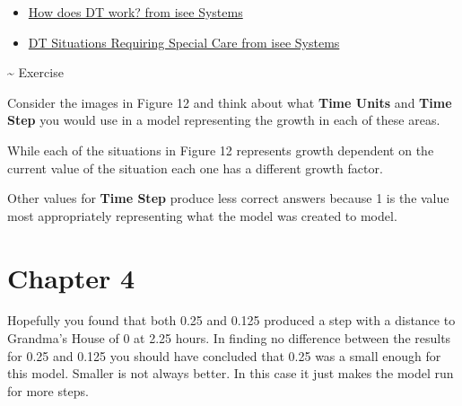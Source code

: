 \documentclass[]{memoir}
\renewcommand{\u}[1]{\textbf{#1}}
\begin{document}
\begin{itemize}
\itemsep1pt\parskip0pt
\item
  \href{http://www.iseesystems.com/Helpv9/Content/DT/How_does_DT_work_.htm}{How
  does DT work? from isee Systems}
\item
  \href{http://www.iseesystems.com/Helpv9/Content/DT/DT_Special_Care.htm}{DT
  Situations Requiring Special Care from isee Systems}
\end{itemize}

\textasciitilde{} Exercise

Consider the images in Figure 12 and think about what \u{Time Units} and
\u{Time Step} you would use in a model representing the growth in each
of these areas.


While each of the situations in Figure 12 represents growth dependent on
the current value of the situation each one has a different growth
factor.


Other values for \u{Time Step} produce less correct answers because 1 is
the value most appropriately representing what the model was created to
model.

\section{Chapter 4}


Hopefully you found that both 0.25 and 0.125 produced a step with a
distance to Grandma's House of 0 at 2.25 hours. In finding no difference
between the results for 0.25 and 0.125 you should have concluded that
0.25 was a small enough for this model. Smaller is not always better. In
this case it just makes the model run for more steps.
\end{document}
